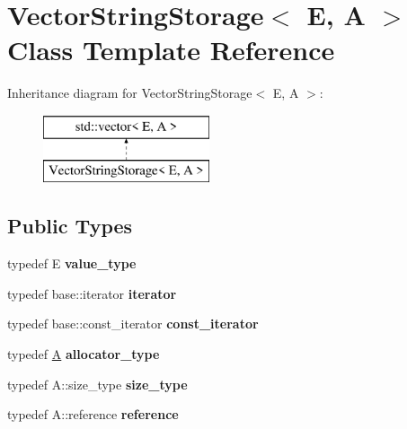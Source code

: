 \hypertarget{classVectorStringStorage}{}\section{Vector\+String\+Storage$<$ E, A $>$ Class Template Reference}
\label{classVectorStringStorage}
Inheritance diagram for Vector\+String\+Storage$<$ E, A $>$\+:\begin{figure}[H]
\begin{center}
\leavevmode
\includegraphics[height=2.000000cm]{classVectorStringStorage}
\end{center}
\end{figure}
\subsection*{Public Types}
\begin{DoxyCompactItemize}
\item 
\hypertarget{classVectorStringStorage_afd140b5a19c71c47268245918d63755c}{}typedef E {\bfseries value\+\_\+type}\label{classVectorStringStorage_afd140b5a19c71c47268245918d63755c}

\item 
\hypertarget{classVectorStringStorage_af6c37516dc6f723f449a9a474c308c6d}{}typedef base\+::iterator {\bfseries iterator}\label{classVectorStringStorage_af6c37516dc6f723f449a9a474c308c6d}

\item 
\hypertarget{classVectorStringStorage_aa28baf04f886bc26ad3c651ea7857238}{}typedef base\+::const\+\_\+iterator {\bfseries const\+\_\+iterator}\label{classVectorStringStorage_aa28baf04f886bc26ad3c651ea7857238}

\item 
\hypertarget{classVectorStringStorage_a025761740e574bd145f74a1a96e08b89}{}typedef \hyperlink{structA}{A} {\bfseries allocator\+\_\+type}\label{classVectorStringStorage_a025761740e574bd145f74a1a96e08b89}

\item 
\hypertarget{classVectorStringStorage_a7cd48070f11a2870992f35aeaa470be0}{}typedef A\+::size\+\_\+type {\bfseries size\+\_\+type}\label{classVectorStringStorage_a7cd48070f11a2870992f35aeaa470be0}

\item 
\hypertarget{classVectorStringStorage_ac4433088069bd9e6769d7cd1996c0eba}{}typedef A\+::reference {\bfseries reference}\label{classVectorStringStorage_ac4433088069bd9e6769d7cd1996c0eba}

\end{DoxyCompactItemize}
